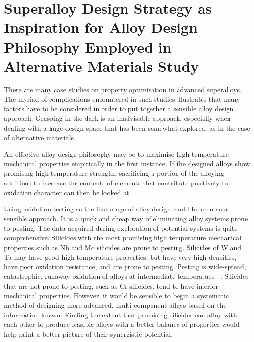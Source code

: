\section{Superalloy Design Strategy as Inspiration for Alloy Design Philosophy Employed in Alternative Materials Study}

There are many case studies on property optimisation in advanced superalloys.  The myriad of complications encountered in such studies  illustrates that many factors have to be considered in order to put together a sensible alloy design approach.  Grasping in the dark is an inadvisable approach, especially when dealing with a huge design space that has been somewhat explored, as in the case of alternative materials. 

An effective alloy design philosophy may be to maximise high temperature mechanical properties empirically in the first instance.  If the designed alloys show promising high temperature strength, sacrificing a portion of the alloying additions to increase the contents of elements that contribute positively to oxidation character can then be looked at. 

Using oxidation testing as the first stage of alloy design could be seen as a sensible approach.  It is a quick and cheap way of eliminating alloy systems prone to pesting.  The data acquired during exploration of potential systems is quite comprehensive.  Silicides with the most promising high temperature mechanical properties such as Nb and Mo silicides are prone to pesting.  Silicides of W and Ta may have good high temperature properties, but have very high densities, have poor oxidation resistance, and are prone to pesting.  Pesting is wide-spread, catastrophic, runaway oxidation of alloys at intermediate temperatues ~\cite{nesbitt93, shah92}.  Silicides that are not prone to pesting, such as Cr silicides, tend to have inferior mechanical properties.  However, it would be sensible to begin a systematic method of designing more advanced, multi-component alloys based on the information known.  Finding the extent that promising silicides can alloy with each other to produce feasible alloys with a better balance of properties would help paint a better picture of their synergistic potential.


